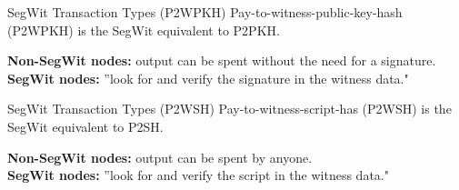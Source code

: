\documentclass[]{beamer}
\begin{document}
\begin{frame}{SegWit Transaction Types (P2WPKH)}
	Pay-to-witness-public-key-hash (P2WPKH) is the SegWit equivalent to P2PKH.\\
	\vspace{1.5em}
	
	\vspace{1.5em}

	\textbf{Non-SegWit nodes:} output can be spent without the need for a signature.\\
	\vspace{0.5em}
	\textbf{SegWit nodes:} ''look for and verify the signature in the witness data."
\end{frame}

\begin{frame}{SegWit Transaction Types (P2WSH)}
	Pay-to-witness-script-has (P2WSH) is the SegWit equivalent to P2SH.\\
	\vspace{1.5em}
	
	\vspace{1.5em}

	\textbf{Non-SegWit nodes:} output can be spent by anyone.\\
	\vspace{0.5em}
	\textbf{SegWit nodes:} ''look for and verify the script in the witness data."
\end{frame}
\end{document}
